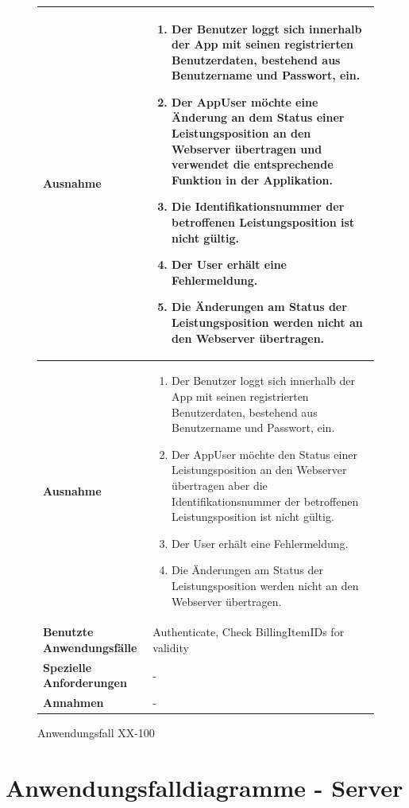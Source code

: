 			\begin{figure}[h]
	\centering
	\begin{tabularx}{\textwidth}{ X | X }
		\textbf{Ausnahme} &
				\begin{enumerate}
				\item Der Benutzer loggt sich innerhalb der App mit seinen registrierten Benutzerdaten, bestehend aus Benutzername und Passwort,  ein.  
					 \item Der AppUser m\"ochte eine \"Anderung an dem Status einer Leistungsposition an den Webserver \"ubertragen und verwendet die entsprechende Funktion in der Applikation. 
					 \item Die Identifikationsnummer der betroffenen Leistungsposition ist nicht g\"ultig.
					 \item Der User erh\"alt eine Fehlermeldung.
					 \item Die \"Anderungen am Status der Leistungsposition werden nicht an den Webserver \"ubertragen.
				\end{enumerate} \\ \hline
						\textbf{Ausnahme} &
				\begin{enumerate}
				\item Der Benutzer loggt sich innerhalb der App mit seinen registrierten Benutzerdaten, bestehend aus Benutzername und Passwort,  ein.  
					 \item Der AppUser m\"ochte den Status einer Leistungsposition an den Webserver \"ubertragen aber die Identifikationsnummer der betroffenen Leistungsposition ist nicht g\"ultig.
					 \item Der User erh\"alt eine Fehlermeldung.
					 \item Die \"Anderungen am Status der Leistungsposition werden nicht an den Webserver \"ubertragen.
				\end{enumerate}  \\ \hline
		\textbf{Benutzte Anwendungsfälle} & Authenticate,  Check BillingItemIDs for validity\\ \hline
		\textbf{Spezielle Anforderungen} & - \\ \hline
		\textbf{Annahmen} & -
	\end{tabularx}
	\caption{Anwendungsfall XX-100}
	\label{fig:anwendungsfall-app-tabelle-xx-4}
\end{figure}

\clearpage

\section{Anwendungsfalldiagramme - Server}

